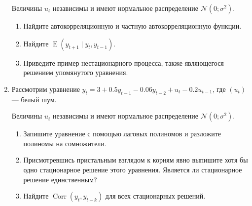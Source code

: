 \documentclass[12pt]{article}
\DeclareMathOperator{\Corr}{Corr}
\DeclareMathOperator{\E}{E}
\def \cN{\mathcal{N}}
\begin{document}
\begin{enumerate}
Величины $u_t$ независимы и имеют нормальное распределение $\cN(0;\sigma^2)$.

\begin{enumerate}
	\item Найдите автокорреляционную и частную автокорреляционную функции. 
	\item Найдите $\E(y_{t+1} \mid y_{t}, y_{t-1})$.
	\item Приведите пример нестационарного процесса, также являющегося решением упомянутого уравнения.
\end{enumerate}


\item Рассмотрим уравнение $y_t = 3 + 0.5 y_{t-1} - 0.06 y_{t-2} + u_t - 0.2 u_{t-1}$, где $(u_t)$ — белый шум. 

Величины $u_t$ независимы и имеют нормальное распределение $\cN(0;\sigma^2)$.

\begin{enumerate}
	\item Запишите уравнение с помощью лаговых полиномов и разложите полиномы на сомножители. 
	\item Присмотревшись пристальным взглядом к корням явно выпишите хотя бы одно стационарное решение этого уравнения. 
	Является ли стационарное решение единственным?
	\item Найдите $\Corr(y_t, y_{t-k})$ для всех стационарных решений. 
\end{enumerate}



\end{enumerate}
\end{document}
